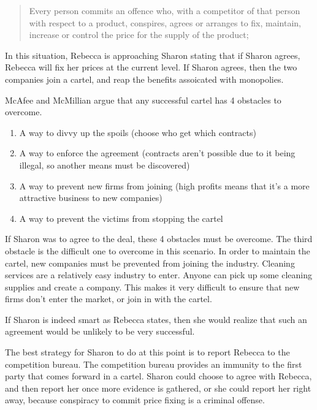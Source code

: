\documentclass[12pt]{article}
\begin{document}
\begin{quotation}
Every person commits an offence who, with a competitor of that person with respect to a product, conspires, agrees or arranges to fix, maintain, increase or control the price for the supply of the product;
\end{quotation}

In this situation, Rebecca is approaching Sharon stating that if Sharon agrees, Rebecca will fix her prices at the current level. If Sharon agrees, then the two companies join a cartel, and reap the benefits assoicated with monopolies.

McAfee and McMillian\cite[pg. 1]{biddingRings} argue that any successful cartel has 4 obstacles to overcome. 

\begin{enumerate}
\item A way to divvy up the spoils (choose who get which contracts)
\item A way to enforce the agreement (contracts aren't possible due to it being illegal, so another means must be discovered)
\item A way to prevent new firms from joining (high profits means that it's a more attractive business to new companies)
\item A way to prevent the victims from stopping the cartel
\end{enumerate}

If Sharon was to agree to the deal, these 4 obstacles must be overcome. The third obstacle is the difficult one to overcome in this scenario. In order to maintain the cartel, new companies must be prevented from joining the industry. Cleaning services are a relatively easy industry to enter. Anyone can pick up some cleaning supplies and create a company. This makes it very difficult to ensure that new firms don't enter the market, or join in with the cartel.

If Sharon is indeed smart as Rebecca states, then she would realize that such an agreement would be unlikely to be very successful.

The best strategy for Sharon to do at this point is to report Rebecca to the competition bureau. The competition bureau provides an immunity \cite{immunity} to the first party that comes forward in a cartel. Sharon could choose to agree with Rebecca, and then report her once more evidence is gathered, or she could report her right away, because conspiracy to commit price fixing is a criminal offense.\cite[45.1.a]{compAct}
\end{document}
